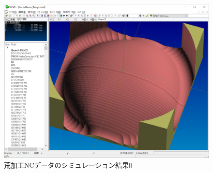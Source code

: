 \begin{figure}[H]
\centering
\includegraphics[scale=0.5]{No2/fig/fig29.png}
\caption{荒加工NCデータのシミュレーション結果Ⅱ}
\label{fig:ncvc29}
\end{figure}
